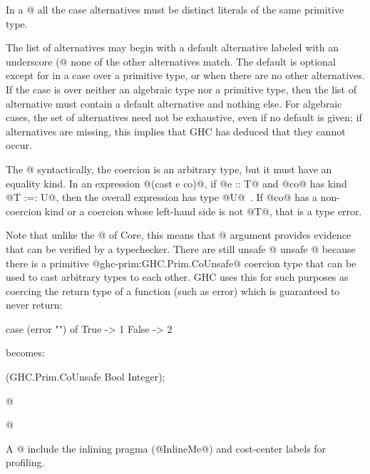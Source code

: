 \documentclass[10pt]{article}
\begin{document}
In a @%
all the case alternatives must be distinct literals of the same primitive type.

The list of alternatives may begin with a 
default alternative labeled with an underscore (@%
none of the other alternatives match.  The default is optional except for in a case
over a primitive type, or when there are no other alternatives.
If the case is over neither an
algebraic type nor a primitive type, then the list of alternative must contain a default alternative and nothing else.
For algebraic cases, the set of alternatives
need not be exhaustive, even if no default is given; if alternatives are missing,
this implies that GHC has deduced that they cannot occur. 

The @%
syntactically, the coercion is an arbitrary type, but it must have an
equality kind. In an expression @(cast e co)@, if @e :: T@ and @co@
has kind @T :=: U@, then the overall expression has type
@U@~\citep{ghc-fc-commentary}. If @co@ has a non-coercion kind or a
coercion whose left-hand side is not @T@, that is a type error. 

Note
that unlike the @%
of Core, this means that @%
argument provides evidence that can be verified by a
typechecker. There are still unsafe @%
unsafe @%
because there is a primitive @ghc-prim:GHC.Prim.CoUnsafe@ coercion type that
can be used to cast arbitrary types to each other. GHC uses this for
such purposes as coercing the return type of a function (such as
error) which is guaranteed to never return:
\begin{code}
case (error "") of
  True -> 1
  False ->  2
\end{code}
becomes:
\begin{code}
    (GHC.Prim.CoUnsafe Bool Integer);
\end{code}
@%

@%
 
A @%
include the inlining pragma (@InlineMe@) and cost-center labels for profiling.
\end{document}

